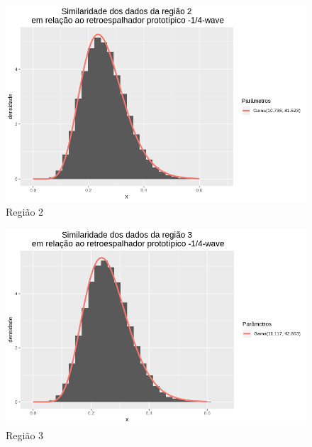 \documentclass[12pt]{article}
\begin{document}
\begin{figure}[!h]
    \centering
    \includegraphics[width = \linewidth]{../../Images/Report_18_12_20/nwv_region2.png}
    \caption{Região 2}
    \label{fig:nwv_r2}
\end{figure}

\begin{figure}[!h]
    \centering
    \vspace{0.1\linewidth}
    \includegraphics[width = \linewidth]{../../Images/Report_18_12_20/nwv_region3.png}
    \caption{Região 3}
    \label{fig:nwv_r3}
\end{figure}
\end{document}
